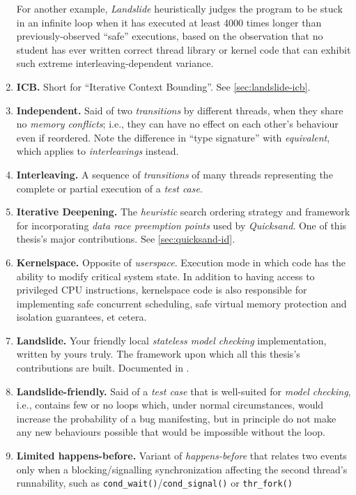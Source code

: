 \begin{enumerate}
		For another example, {\em Landslide} heuristically judges the program to be stuck in an infinite loop
		when it has executed at least 4000 times longer than previously-observed ``safe'' executions,
		based on the observation that no student has ever written correct thread library or kernel code
		that can exhibit such extreme interleaving-dependent variance.
	\item {\bf ICB.} Short for ``Iterative Context Bounding''. See \cref{sec:landslide-icb}.
	\item {\bf Independent.}
		Said of two {\em transitions} by different threads,
		when they share no {\em memory conflicts};
		i.e., they can have no effect on each other's behaviour even if reordered.
		Note the difference in ``type signature'' with {\em equivalent}, which applies to {\em interleavings} instead.
	\item {\bf Interleaving.}
		A sequence of {\em transitions} of many threads representing the complete or partial execution
		of a {\em test case}.
	\item {\bf Iterative Deepening.}
		The {\em heuristic} search ordering strategy and framework for incorporating {\em data race preemption points}
		used by {\em Quicksand}.
		One of this thesis's major contributions.
		See \cref{sec:quicksand-id}.
	\item {\bf Kernelspace.}
		Opposite of {\em userspace}.
		Execution mode in which code has the ability to modify critical system state.
		In addition to having access to privileged CPU instructions,
		kernelspace code is also responsible for implementing safe
		concurrent scheduling, safe virtual memory protection and isolation guarantees, et cetera.
	\item {\bf Landslide.}
		Your friendly local {\em stateless model checking} implementation, written by yours truly.
		The framework upon which all this thesis's contributions are built.
		Documented in .
	\item {\bf Landslide-friendly.}
		Said of a {\em test case} that is well-suited for {\em model checking},
		i.e.,
		contains few or no loops which,
		under normal circumstances, would increase the probability of a bug manifesting,
		but in principle do not make any new behaviours possible that would be impossible without the loop.
	\item {\bf Limited happens-before.}
		Variant of {\em happens-before} that relates two events only when a blocking/signalling synchronization affecting
		the second thread's runnability, such as {\tt cond\_wait()}/{\tt cond\_signal()} or {\tt thr\_fork()}

\end{enumerate}
